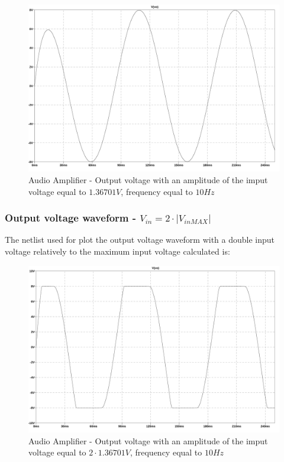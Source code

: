 \documentclass[10pt,a4paper]{article}
\begin{document}
\begin{figure}[H]
  \centering
  \includegraphics[width=14cm]{graph/1d4b.jpg}
  \caption{Audio Amplifier - Output voltage with an amplitude of the imput voltage equal to $1.36701V$, frequency equal to $10Hz$}
  \label{1d4bgraph}
\end{figure}

\subsubsection{Output voltage waveform - $V_{in} = 2 \cdot |V_{in MAX} |$}
The netlist used for plot the output voltage waveform with a double input voltage relatively to the maximum input voltage calculated is:\\


\begin{figure}[H]
  \centering
  \includegraphics[width=14cm]{graph/1d4c.jpg}
  \caption{Audio Amplifier - Output voltage with an amplitude of the imput voltage equal to $2 \cdot 1.36701V$, frequency equal to $10Hz$}
  \label{1d4cgraph}
\end{figure}
\end{document}
